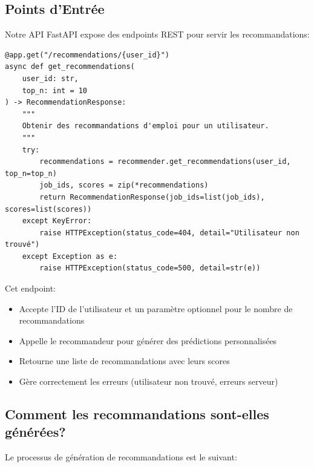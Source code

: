 \documentclass[12pt,a4paper]{article}
\begin{document}
\subsection{Points d'Entrée}

Notre API FastAPI expose des endpoints REST pour servir les recommandations:

\begin{lstlisting}[caption=Endpoint de recommandation]
@app.get("/recommendations/{user_id}")
async def get_recommendations(
    user_id: str,
    top_n: int = 10
) -> RecommendationResponse:
    """
    Obtenir des recommandations d'emploi pour un utilisateur.
    """
    try:
        recommendations = recommender.get_recommendations(user_id, top_n=top_n)
        job_ids, scores = zip(*recommendations)
        return RecommendationResponse(job_ids=list(job_ids), scores=list(scores))
    except KeyError:
        raise HTTPException(status_code=404, detail="Utilisateur non trouvé")
    except Exception as e:
        raise HTTPException(status_code=500, detail=str(e))
\end{lstlisting}

Cet endpoint:
\begin{itemize}
    \item Accepte l'ID de l'utilisateur et un paramètre optionnel pour le nombre de recommandations
    \item Appelle le recommandeur pour générer des prédictions personnalisées
    \item Retourne une liste de recommandations avec leurs scores
    \item Gère correctement les erreurs (utilisateur non trouvé, erreurs serveur)
\end{itemize}

\subsection{Comment les recommandations sont-elles générées?}

Le processus de génération de recommandations est le suivant:
\end{document}
